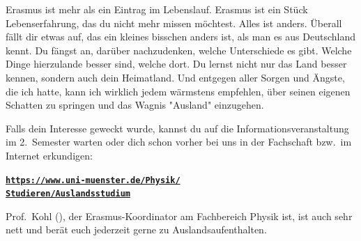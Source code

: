 \begin{multicols}{2}
Erasmus ist mehr als ein Eintrag im Lebenslauf.
Erasmus ist ein Stück Lebenserfahrung, das du nicht mehr missen möchtest.
Alles ist anders.
Überall fällt dir etwas auf, das ein kleines bisschen anders ist, als man es aus Deutschland kennt.
Du fängst an, darüber nachzudenken, welche Unterschiede es gibt.
Welche Dinge hierzulande besser sind, welche dort.
Du lernst nicht nur das Land besser kennen, sondern auch dein Heimatland.
Und entgegen aller Sorgen und Ängste, die ich hatte, kann ich wirklich jedem wärmstens empfehlen, über seinen eigenen Schatten zu springen und das Wagnis "Ausland" einzugehen.

Falls dein Interesse geweckt wurde, kannst du auf die Informationsveranstaltung im 2.~Semester warten oder dich schon vorher bei uns in der Fachschaft bzw.\ im Internet erkundigen:

\href{https://www.uni-muenster.de/Physik/Studieren/Auslandsstudium}{\textbf{\texttt{https://www.uni-muenster.de/Physik/\\Studieren/Auslandsstudium}}}

Prof.~Kohl (), der Erasmus-Koordinator am Fachbereich Physik ist, ist auch sehr nett und berät euch jederzeit gerne zu Auslandsaufenthalten.

\end{multicols}
